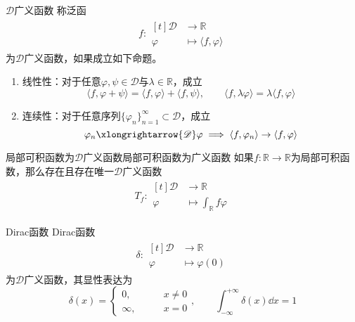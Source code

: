\documentclass[lang = cn, scheme = chinese, thmcnt = section]{elegantbook}
\newcommand{\R}{\mathbb{R}}            %
\newcommand{\sub}{\subset}             %
\newcommand{\toD}{\xlongrightarrow{\mathscr{D}}}
\begin{document}
\begin{definition}{$\mathscr{D}$广义函数}
	称泛函
	\begin{align*}
		f:\begin{aligned}[t]
			\mathscr{D} &\longrightarrow \R\\
			\varphi &\longmapsto \langle f,\varphi \rangle
		\end{aligned}
	\end{align*}
	为$\mathscr{D}$广义函数，如果成立如下命题。
	\begin{enumerate}
		\item 线性性：对于任意$\varphi,\psi\in \mathscr{D}$与$\lambda\in\R$，成立
		$$
		\langle f,\varphi+\psi \rangle
		=\langle f,\varphi \rangle
		+\langle f,\psi \rangle,\qquad
		\langle f,\lambda\varphi \rangle
		=\lambda\langle f,\varphi \rangle
		$$
		\item 连续性：对于任意序列$\{ \varphi_n \}_{n=1}^{\infty}\sub\mathscr{D}$，成立%
		$$
		\varphi_n\toD \varphi\implies
		\langle f,\varphi_n \rangle\to\langle f,\varphi \rangle
		$$
	\end{enumerate}
\end{definition}

\begin{proposition}{局部可积函数为$\mathscr{D}$广义函数}{局部可积函数为广义函数}
	如果$f:\R\to\R$为局部可积函数，那么存在且存在唯一$\mathscr{D}$广义函数
	\begin{align*}
		T_f:\begin{aligned}[t]
			\mathscr{D} &\longrightarrow \R\\
			\varphi &\longmapsto \int_{\R}f\varphi
		\end{aligned}
	\end{align*}
\end{proposition}

\begin{proposition}{Dirac函数}
	Dirac函数
	\begin{align*}
		\delta:\begin{aligned}[t]
			\mathscr{D} &\longrightarrow \R\\
			\varphi &\longmapsto \varphi(0)
		\end{aligned}
	\end{align*}
	为$\mathscr{D}$广义函数，其显性表达为
	$$
	\delta(x)=\begin{cases}
		0,\qquad & x\ne 0\\
		\infty,\qquad & x=0
	\end{cases},\qquad
	\int_{-\infty}^{+\infty}\delta(x)\dd x=1
	$$
\end{proposition}
\end{document}
